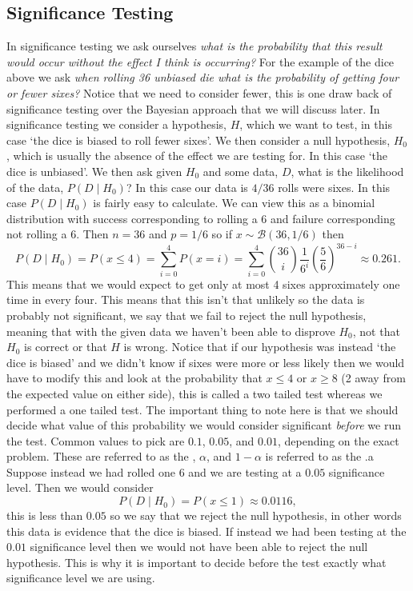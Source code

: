 \documentclass[a4paper]{article}
\newcommand{\st}{\mid}
\newcommand{\distributed}{\sim}
\newcommand{\binomial}{\mathcal{B}}
\begin{document}
    \subsection{Significance Testing}
    In significance testing we ask ourselves \emph{what is the probability that this result would occur \emph{without} the effect I think is occurring?}
    For the example of the dice above we ask \emph{when rolling 36 unbiased die what is the probability of getting four or fewer sixes?}
    Notice that we need to consider fewer, this is one draw back of significance testing over the Bayesian approach that we will discuss later.
    In significance testing we consider a hypothesis, \(H\), which we want to test, in this case `the dice is biased to roll fewer sixes'.
    We then consider a null hypothesis, \(H_0\), which is usually the absence of the effect we are testing for.
    In this case `the dice is unbiased'.
    We then ask given \(H_0\) and some data, \(D\), what is the likelihood of the data, \(P(D\st H_0)\)?
    In this case our data is \(4/36\) rolls were sixes.
    In this case \(P(D\st H_0)\) is fairly easy to calculate.
    We can view this as a binomial distribution with success corresponding to rolling a 6 and failure corresponding not rolling a 6.
    Then \(n = 36\) and \(p = 1/6\) so if \(x\distributed\binomial(36, 1/6)\) then
    \[P(D\st H_0) = P(x \le 4) = \sum_{i=0}^{4} P(x = i) = \sum_{i=0}^{4}{\binom{36}{i}}\frac{1}{6^i}\left(\frac{5}{6}\right)^{36 - i} \approx 0.261.\]
    This means that we would expect to get only at most 4 sixes approximately one time in every four.
    This means that this isn't that unlikely so the data is probably not significant, we say that we fail to reject the null hypothesis, meaning that with the given data we haven't been able to disprove \(H_0\), not that \(H_0\) is correct or that \(H\) is wrong.
    Notice that if our hypothesis was instead `the dice is biased' and we didn't know if sixes were more or less likely then we would have to modify this and look at the probability that \(x \le 4\) or \(x \ge 8\) (2 away from the expected value on either side), this is called a two tailed test whereas we performed a one tailed test.
    The important thing to note here is that we should decide what value of this probability we would consider significant \emph{before} we run the test.
    Common values to pick are \(0.1\), \(0.05\), and \(0.01\), depending on the exact problem.
    These are referred to as the , \(\alpha\), and \(1 - \alpha\) is referred to as the .a
    Suppose instead we had rolled one 6 and we are testing at a \(0.05\) significance level.
    Then we would consider
    \[P(D\st H_0) = P(x \le 1) \approx 0.0116,\]
    this is less than \(0.05\) so we say that we reject the null hypothesis, in other words this data is evidence that the dice is biased.
    If instead we had been testing at the \(0.01\) significance level then we would not have been able to reject the null hypothesis.
    This is why it is important to decide before the test exactly what significance level we are using.
    
\end{document}
